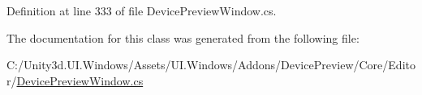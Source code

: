 Definition at line 333 of file Device\+Preview\+Window.\+cs.



The documentation for this class was generated from the following file\+:\begin{DoxyCompactItemize}
\item 
C\+:/\+Unity3d.\+U\+I.\+Windows/\+Assets/\+U\+I.\+Windows/\+Addons/\+Device\+Preview/\+Core/\+Editor/\hyperlink{_device_preview_window_8cs}{Device\+Preview\+Window.\+cs}\end{DoxyCompactItemize}
